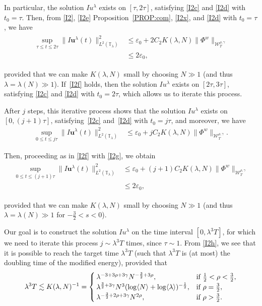 \documentclass[letterpaper, 11pt,  reqno]{amsart}
\newcommand{\1}{\hspace{0.5mm}\text{I}\hspace{0.5mm}}
\newcommand{\noi}{\noindent}
\newcommand{\T}{\mathbb{T}}
\newcommand{\eps}{\varepsilon}
\newcommand{\g}{\gamma}
\newcommand{\ld}{\lambda}
\newcommand{\les}{\lesssim}
\newcommand{\jb}[1]
{\langle #1 \rangle}
\newcommand{\W}{\mathcal{W}}
\newcommand{\uu}{\mathbf{u}}
\numberwithin{equation}{section}
\numberwithin{theorem}{section}
\begin{document}
\noi
In particular, the solution $Iu^\ld$ exists on $[\tau,  2\tau]$, 
satisfying 
\eqref{I2c} and \eqref{I2d}
with $t_0 = \tau$.
Then,  
from 
\eqref{I2}, \eqref{I2e} 
Proposition~\ref{PROP:com}, 
 \eqref{I2x}, and \eqref{I2d} with $t_0 = \tau$, we have 
\begin{align}
\begin{split}
 \sup_{\tau\le t\le2 \tau} \| I \uu^\ld(t) \|^2_{L^2(\T_\ld)} 
&  \le \eps_0 + 
2 C_2 K(\ld, N)   \|  \Phi^{w}  \|_{\W_{T}^{\rho, \g}}   \\
&  \le 2\eps_0, 
\end{split}
\label{I2f}
\end{align}


\noi
provided that 
we can make 
 $K(\ld, N)$  small by 
choosing $N \gg 1$
(and thus $\ld = \ld(N) \gg1$).
If~\eqref{I2f} holds, 
then 
the solution $Iu^\ld$ exists on $[2\tau, 3\tau]$, 
satisfying 
\eqref{I2c} and \eqref{I2d}
with $t_0 = 2\tau$, 
which allows us to iterate this process.

After $j$ steps, 
this iterative process shows that 
the solution $Iu^\ld$ exists on $[0, (j+1)\tau]$, 
satisfying~\eqref{I2c} and~\eqref{I2d}
 with $t_0 = j \tau$, and moreover, we have 
\begin{align}
 \sup_{0 \le t\le j \tau} \| I \uu^\ld(t) \|^2_{L^2(\T_\ld)} 
&  \le \eps_0 + 
j C_2 K(\ld, N)   \|  \Phi^{w}  \|_{\W_{T}^{\rho, \g}}.
\label{I2g}
\end{align}

\noi
Then, proceeding as in \eqref{I2f} with \eqref{I2g}, we obtain
\begin{align}
\begin{split}
 \sup_{0 \le t\le(j+1) \tau} \| I \uu^\ld(t) \|^2_{L^2(\T_\ld)} 
&  \le \eps_0 + 
(j+1) C_2 K(\ld, N)   \|  \Phi^{w}  \|_{\W_{T}^{\rho, \g}}   \\
&  \le 2\eps_0, 
\end{split}
\label{I2h}
\end{align}


\noi
provided that 
we can make 
 $K(\ld, N)$  small by 
choosing $N \gg 1$
(and thus $\ld = \ld(N) \gg1$
for $- \frac 32 < s < 0$).


Our goal is to construct the solution $Iu^\ld$ on the time interval $[0, \ld^3 T]$, 
for which we need to iterate this process $j \sim \ld^3 T$ times, 
since  $\tau \sim1$.
From \eqref{I2h}, 
we see that 
 it is possible 
to reach the target time $\ld^3 T$
(such that $\ld^3T$ is (at most) the doubling time
of the modified energy), 
provided that 
\begin{align}
\ld^3T\les  K(\ld, N)^{-1}
= \begin{cases}
\ld^{- 3+ 3\rho+3\g} N^{-\frac 32 + 3\rho}, & \text{if $\frac 12 < \rho < \frac 32$}, \\
\ld^{\frac 32 + 3\g} N^{3} (\log \jb{N} + \log \jb{\ld})^{-\frac 12}, & \text{if $\rho =  \frac 32$}, \\
\ld^{ -\frac 32 + 2\rho +3\g} N^{2\rho}, & \text{if $ \rho >  \frac 32$}.
\end{cases}
\label{IT0b}
\end{align}
\end{document}
